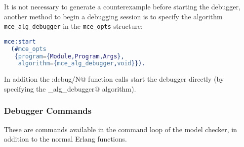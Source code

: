 \documentclass[a4paper]{article}
\begin{document}
It is not necessary to generate a counterexample before starting the debugger,
another method to begin a debugging session is to specify the algorithm
\lstinline{mce_alg_debugger} in the \lstinline{mce_opts} structure:
\begin{lstlisting}[language=Erlang]
mce:start
  (#mce_opts
   {program={Module,Program,Args},
    algorithm={mce_alg_debugger,void}}).
\end{lstlisting}
In addition the \lstinline@mce:debug/N@ function calls start
the debugger directly (by specifying the \lstinline@mce_alg_debugger@
algorithm).

\subsubsection{Debugger Commands}
These are commands available in the
command loop of the model checker,
in addition to the normal Erlang
functions.
\end{document}
